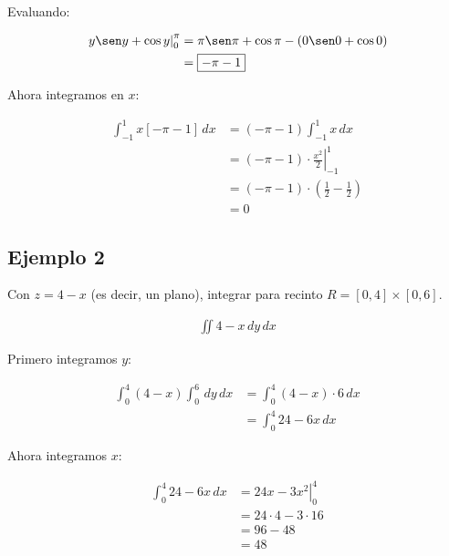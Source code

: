 Evaluando:

\begin{align*}
    \left.y \sen y + \cos y\right|_{0}^{\pi} & = \pi \sen\pi + \cos\pi - (0 \sen 0 + \cos 0) \\
    &= \boxed{-\pi - 1}
\end{align*}

Ahora integramos en \(x\):

\begin{align*}
    \int_{-1}^{1} x [-\pi - 1] \,dx & = (-\pi - 1) \int_{-1}^{1} x \,dx \\
    & = (-\pi - 1) \cdot \left.\frac{x^{2}}{2}\right|_{-1}^{1} \\
    & = (-\pi - 1) \cdot \left(\frac{1}{2} - \frac{1}{2}\right) \\
    & = \boxed{0}
\end{align*}

\subsection{Ejemplo 2}

Con \(z = 4 - x\) (es decir, un plano), integrar para recinto \(R = [0,4] \times [0,6]\).

\begin{align*}
    \iint 4 - x \,dy\,dx
\end{align*}

Primero integramos \(y\):

\begin{align*}
    \int_{0}^{4} (4-x) \int_{0}^{6} \,dy \,dx & = \int_{0}^{4} (4-x) \cdot 6 \,dx \\
    & = \int_{0}^{4} 24-6x \,dx 
\end{align*}

Ahora integramos \(x\):

\begin{align*}
    \int_{0}^{4} 24-6x \,dx & = \left.24x - 3x^{2}\right|_{0}^{4} \\
    & = 24 \cdot 4 - 3 \cdot 16 \\
    & = 96 - 48 \\
    & = \boxed{48}
\end{align*}